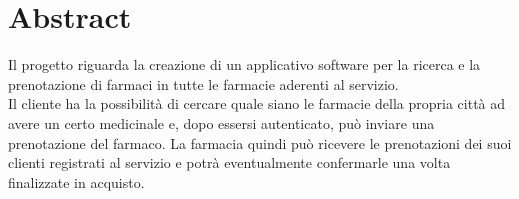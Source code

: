 \newpage
{}
\section{Abstract}
Il progetto riguarda la creazione di un applicativo software per la ricerca e
la prenotazione di farmaci in tutte le farmacie aderenti al servizio. \\
Il cliente ha la possibilità di cercare quale siano le farmacie della propria città ad
avere un certo medicinale e, dopo essersi autenticato, può inviare una
prenotazione del farmaco. La farmacia quindi può ricevere le prenotazioni dei
suoi clienti registrati al servizio e potrà eventualmente confermarle 
una volta finalizzate in acquisto.
